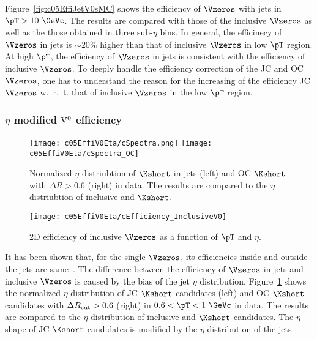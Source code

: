 Figure~\ref{fig:c05EffiJetV0sMC} shows the efficiency of $\Vzeros$ with jets
in $\pT>10~\GeVc$.
The results are compared with those of the inclusive $\Vzeros$ as well as
the those obtained in three sub-$\eta$ bins.
In general, the efficinecy of $\Vzeros$ in jets is $\sim 20\%$ higher than
that of inclusive $\Vzeros$ in low $\pT$ region.
At high $\pT$, the efficiency of $\Vzeros$ in jets is consistent with
the efficiency of inclusive $\Vzeros$.
To deeply handle the efficiency correction of the JC and OC $\Vzeros$,
one has to understand the reason for the increasing of the efficiency
JC $\Vzeros$ w.~r.~t. that of inclusive $\Vzeros$ in the low $\pT$ region.

\subsubsection{$\eta$ modified ${\rm V}^{0}$ efficiency}
\label{sec:c05ScaledV0Effi}

\begin{figure}[htb]
\begin{center}
\texttt{[image: c05EffiV0Eta/cSpectra.png]}
\texttt{[image: c05EffiV0Eta/cSpectra\_OC]}
\caption{Normalized $\eta$ distriubtion of $\Kshort$ in jets (left)
         and OC $\Kshort$ with $\Delta R>0.6$ (right) in data.
         The results are compared to the $\eta$ distriubtion of
         inclusive and $\Kshort$.}
\label{fig:c05EffiJetV0Wgt}
\end{center}
\end{figure}

\begin{figure}[htb]
\begin{center}
\texttt{[image: c05EffiV0Eta/cEfficiency\_InclusiveV0]}
\caption{2D efficiency of inclusive $\Vzeros$ as a function of $\pT$
         and $\eta$.}
\label{fig:c05EffiIncV02D}
\end{center}
\end{figure}

It has been shown that,
for the single $\Vzeros$, its efficiencies inside and outside the jets are
same~\cite{Kucera:AliPWGJE20140328}.
The difference between the efficiency of $\Vzeros$ in jets and
inclusive $\Vzeros$ is caused by the bias of the jet $\eta$ distribution.
Figure~\ref{fig:c05EffiJetV0Wgt} shows the normalized $\eta$ distribution
of JC $\Kshort$ candidates (left) and OC $\Kshort$ candidates
with $\Delta R_{\rm cut}>0.6$ (right) in $0.6<\pT<1~\GeVc$ in data.
The results are compared to the $\eta$ distribution of inclusive
and $\Kshort$ candidates.
The $\eta$ shape of JC $\Kshort$ candidates is modified by
the $\eta$ distribution of the jets.

